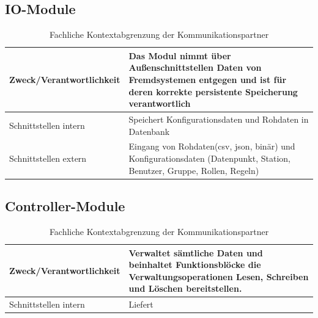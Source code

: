 \subsection{IO-Module}
\begin{table}
	\begin{tabularx}{\textwidth}{X X}
		\hline
		 Zweck/Verantwortlichkeit & Das Modul nimmt über Außenschnittstellen Daten von Fremdsystemen entgegen und ist für deren korrekte persistente Speicherung verantwortlich  \\
		 \hline
		 Schnittstellen intern & Speichert Konfigurationsdaten und Rohdaten in Datenbank \\
		 \hline
		 Schnittstellen extern & Eingang von Rohdaten(csv, json, binär) und Konfigurationsdaten (Datenpunkt, Station, Benutzer, Gruppe, Rollen, Regeln) \\
		 \hline
	\end{tabularx} 
	\caption{Fachliche Kontextabgrenzung der Kommunikationspartner}
	\label{tab:FachlicheKontextabgrenzungDerKommunikationspartner}
\end{table}

\subsection{Controller-Module}
\begin{table}[th]
	\begin{tabularx}{\textwidth}{X X}
		\hline
		Zweck/Verantwortlichkeit & Verwaltet sämtliche Daten und beinhaltet Funktionsblöcke die Verwaltungsoperationen Lesen, Schreiben und Löschen bereitstellen. \\
		\hline
		Schnittstellen intern & Liefert \\
		\hline
	\end{tabularx} 
	\caption{Fachliche Kontextabgrenzung der Kommunikationspartner}
	\label{tab:FachlicheKontextabgrenzungDerKommunikationspartner}
\end{table}

